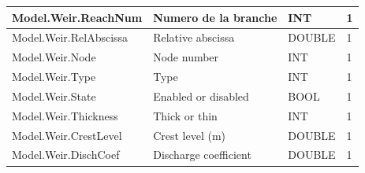 \documentclass[a4paper,11pt]{article}
\begin{document}
\begin{landscape}
\begin{table}[ht]
\begin{center}
\begin{tabular}{|l|l|l|l|}
\hline  Model.Weir.ReachNum & Numero de la branche & INT & 1 \\
\hline  Model.Weir.RelAbscissa & Relative abscissa & DOUBLE & 1 \\
\hline  Model.Weir.Node & Node number & INT & 1 \\
\hline  Model.Weir.Type & Type & INT & 1 \\
\hline  Model.Weir.State & Enabled or disabled & BOOL & 1 \\
\hline  Model.Weir.Thickness & Thick or thin & INT & 1 \\
\hline  Model.Weir.CrestLevel & Crest level (m) & DOUBLE & 1 \\
\hline  Model.Weir.DischCoef & Discharge coefficient & DOUBLE & 1 \\
\hline

\end{tabular} 
\end{center}
\end{table}
\begin{table}[ht]
\begin{center}
\begin{tabular}{|l|l|l|l|}


\end{tabular}
\end{center}
\end{table}
\end{landscape}
\end{document}
